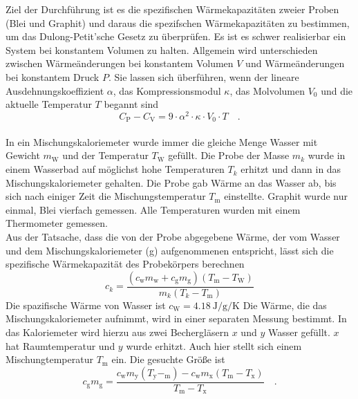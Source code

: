Ziel der Durchführung ist es die spezifischen Wärmekapazitäten zweier Proben (Blei und Graphit) und daraus  die spezifschen Wärmekapazitäten zu bestimmen, um das Dulong-Petit'sche Gesetz zu überprüfen.
Es ist es schwer realisierbar ein System bei konstantem Volumen zu halten. Allgemein wird unterschieden zwischen Wärmeänderungen bei konstantem Volumen $V$ und Wärmeänderungen bei konstantem Druck $P$. Sie lassen sich überführen, wenn der lineare Ausdehnungskoeffizient $\alpha$, das Kompressionsmodul $\kappa$, das Molvolumen $V_0$ und die aktuelle Temperatur $T$ begannt sind
\begin{equation}\label{konstanter Druck -> konstantem Volumen}
  C_\text{P} - C_\text{V} = 9 \cdot \alpha^2 \cdot \kappa \cdot V_0 \cdot T \quad.
\end{equation}  \\
In ein Mischungskaloriemeter wurde immer die gleiche Menge Wasser mit Gewicht $m_\text{W}$ und der Temperatur $T_\text{W}$ gefüllt.
Die Probe der Masse $m_k$ wurde in einem Wasserbad auf möglichst hohe Temperaturen $T_k$ erhitzt und dann in das Mischungskaloriemeter gehalten. Die Probe gab Wärme an das Wasser ab, bis sich nach einiger Zeit die Mischungstemperatur $T_\text{m}$ einstellte. Graphit wurde nur einmal, Blei vierfach gemessen. Alle Temperaturen wurden mit einem Thermometer gemessen.
\\
Aus der Tatsache, dass die von der Probe abgegebene Wärme, der vom Wasser und dem Mischungskaloriemeter (g) aufgenommenen entspricht, lässt sich die spezifische Wärmekapazität des Probekörpers berechnen
\begin{equation}\label{Warmekapazitat Stoff}
  c_k = \frac{(c_\text{w} m_\text{w} + c_\text{g} m_\text{g})(T_\text{m} - T_\text{W})}{m_k (T_k - T_\text{m})}
\end{equation}
Die spazifische Wärme von Wasser ist $c_\text{W} = \SI{4.18}{\joule\per\gram\per\kelvin}$ Die Wärme, die das Mischungskaloriemeter aufnimmt, wird in einer separaten Messung bestimmt. In das Kaloriemeter wird hierzu aus zwei Bechergläsern $x$ und $y$ Wasser gefüllt. $x$ hat Raumtemperatur und $y$ wurde erhitzt. Auch hier stellt sich einem Mischungtemperatur $T_\text{m}$ ein. Die gesuchte Größe ist
\begin{equation}\label{Warmekapazitat Kalorimeter}
  c_\text{g} m_\text{g} = \frac{c_\text{w} m_\text{y}(T_\text{y}-_\text{m}) - c_\text{w} m_\text{x}(T_\text{m}-T_\text{x})}{T_\text{m} - T_\text{x}} \quad.
\end{equation}
